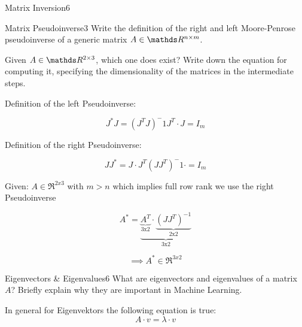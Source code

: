 \begin{questions}
\begin{question}{Matrix Inversion}{6}
\begin{answer}
\end{answer}

\end{question}
	

\begin{question}{Matrix Pseudoinverse}{3}
	Write the definition of the right and left Moore-Penrose pseudoinverse of a generic matrix $A \in \R^{n\times m}$.
	
	Given $A \in \R^{2 \times 3}$, which one does exist? Write down the equation for computing it, specifying the dimensionality of the matrices in the intermediate steps.
	
\begin{answer}

Definition of the left Pseudoinverse:

\begin{equation}
	J^{\text{*}}J = (J^T J)^-1 J^T \cdot J = I_m
\end{equation}

Definition of the right Pseudoinverse:

\begin{equation}
J J^{\text{*}} = J \cdot  J^T (J J^T)^-1 \cdot  = I_m
\end{equation}

Given: $A \in \Re^{2x3}$ with $m > n$ which implies full row rank we use the right Pseudoinverse

\begin{equation}
	A^{\text{*}} = \underbrace{ \underbrace{A^T}_\text{3x2} \cdot \underbrace{(J J^T)^{-1}}_\text{2x2} }_\text{3x2}
\end{equation}

\begin{equation}
	\implies A^{\text{*}} \in \Re^{3x2}
\end{equation}

\end{answer}
\end{question}


\begin{question}{Eigenvectors \& Eigenvalues}{6}
What are eigenvectors and eigenvalues of a matrix $A$? Briefly explain why they are important in Machine Learning.

\begin{answer}
In general for Eigenvektors the following equation is true:
\begin{equation}
	A\cdot v = \lambda \cdot v
\end{equation}


\end{answer}
\end{question}
\end{questions}
